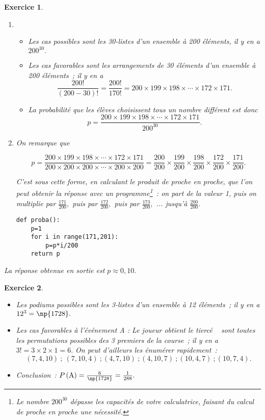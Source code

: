\documentclass[10pt]{article}
\newtheorem{exo}{Exercice}
\begin{document}
\begin{exo}

\begin{enumerate}
\item \begin{itemize}
\item[\textbullet] Les cas possibles sont les 30-listes d'un ensemble à 200 éléments, il y en a $200^{30}.$
\item[\textbullet] Les cas favorables sont les arrangements de 30 éléments d'un ensemble à 200 éléments~; il y en a \[\frac{200!}{(200-30)!}=\frac{200!}{170!}=200\times 199\times 198\times \cdots\times 172\times 171.\]
\item[\textbullet] La probabilité que les élèves choisissent tous un nombre différent est donc
\[p=\frac{200\times 199\times 198\times \cdots\times 172\times 171}{200^{30}}.\]
\end{itemize}
\item On remarque que

\[
p=\frac{200\times 199\times 198\times \cdots\times 172\times 171}{200\times 200\times 200\times\cdots\times 200\times 200}=\frac{200}{200}\times \frac{199}{200}\times \frac{198}{200}\times \frac{172}{200}\times \frac{171}{200}.
\]

C'est sous cette forme, en calculant le produit de proche en proche, que l'on peut obtenir la réponse avec un programme\footnote{Le nombre $200^{30}$ dépasse les capacités de votre calculatrice, faisant du calcul de proche en proche une nécessité.}~: on part de la valeur 1, puis on multiplie par $\frac{171}{200},$ puis par $\frac{172}{200},$ puis par $\frac{173}{200},$ ... jusqu'à $\frac{200}{200}.$

\medskip

\begin{lstlisting}
def proba():
	p=1
	for i in range(171,201):
		p=p*i/200
	return p
\end{lstlisting}


\end{enumerate}

\medskip

La réponse obtenue en sortie est $p\approx 0,10.$

\end{exo}

\begin{exo}

\begin{itemize}
\item[\textbullet] Les podiums possibles sont les 3-listes d'un ensemble à 12 éléments~; il y en a $12^3=\np{1728}.$
\item[\textbullet] Les cas favorables à l'événement A : \og Le joueur obtient le tiercé \fg~{} sont toutes les permutations possibles des 3 premiers de la course~; il y en a $3!=3\times 2\times 1=6.$ On peut d'ailleurs les énumérer rapidement~:
\[(7,4,10)~;~(7,10,4)~;(4,7,10)~;(4,10,7)~;(10,4,7)~;(10,7,4).\]
\item[\textbullet] Conclusion~: $P\left(\text{A}\right)=\frac{6}{\np{1728}}=\frac{1}{288}.$
\end{itemize}

\end{exo}
\end{document}
